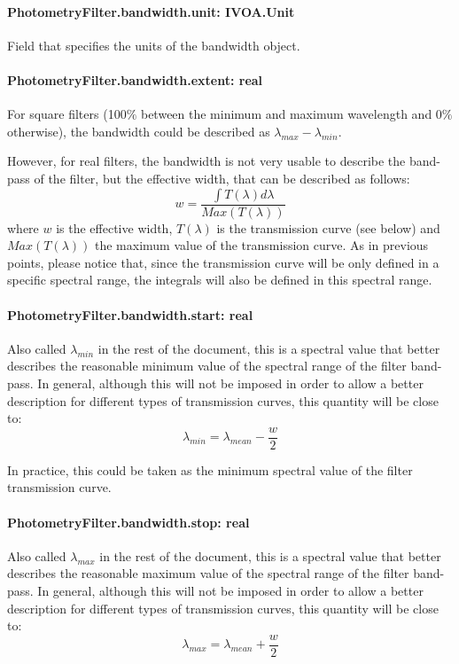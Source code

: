 \documentclass[11pt,a4paper]{ivoa}
\begin{document}
\paragraph{PhotometryFilter.bandwidth.unit: IVOA.Unit}
Field that specifies the units of the bandwidth object.
\par

\paragraph{PhotometryFilter.bandwidth.extent: real}
For square filters (100$\%$  between the minimum and maximum wavelength and 0$\%$  otherwise),
the bandwidth could be described as $\lambda_{max} - \lambda_{min}$.
\par

However, for real filters, the bandwidth is not very usable to describe the band-pass of the
filter, but the effective width, that can be described as follows:
\begin{equation} \label{eq:21}
w = \frac{\int T(\lambda)d\lambda}{Max(T(\lambda))}
\end{equation}
where $w$ is the effective width, $T(\lambda)$ is the transmission curve (see below)
and $Max(T(\lambda))$ the maximum value of the transmission curve. As in previous points,
please notice that, since the transmission curve will be only defined in a specific spectral
range, the integrals will also be defined in this spectral range.
\par

\paragraph{PhotometryFilter.bandwidth.start: real}
Also called $\lambda_{min}$ in the rest of the document, this is a spectral value that better describes
the reasonable minimum value of the spectral range of the filter band-pass. In general,
although this
will not be imposed in order to allow a better description for different types of
transmission curves, this quantity will be close to:
\begin{equation} \label{eq:22}
\lambda_{min} = \lambda_{mean} - \frac{w}{2}
\end{equation}

In practice, this could be taken as the minimum spectral value of the filter transmission curve.
\par

\paragraph{PhotometryFilter.bandwidth.stop: real}
Also called $\lambda_{max}$ in the rest of the document, this is a spectral value that
better describes the reasonable maximum value of the spectral range of the filter band-pass.
In general,
although this will not be imposed in order to allow a better description for different
types of transmission curves, this quantity will be close to:
\begin{equation} \label{eq:23}
\lambda_{max} = \lambda_{mean} + \frac{w}{2}
\end{equation}
\end{document}
